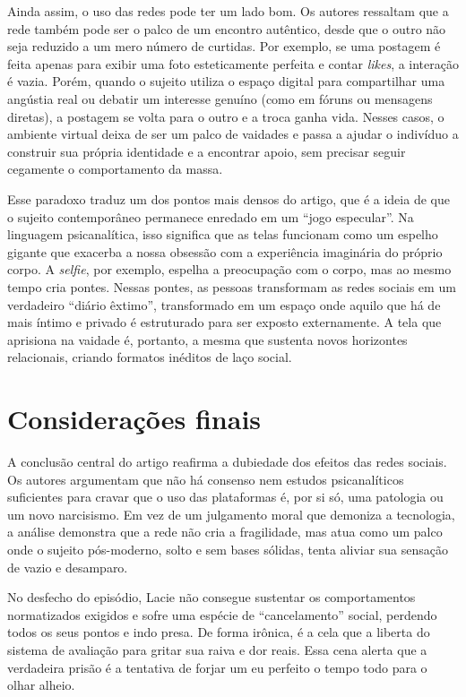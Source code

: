 \documentclass[12pt, a4paper, oneside]{abntex2}
\begin{document}
Ainda assim, o uso das redes pode ter um lado bom. Os autores ressaltam que a rede também pode ser o palco de um encontro autêntico, desde que o outro não seja reduzido a um mero número de curtidas. Por exemplo, se uma postagem é feita apenas para exibir uma foto esteticamente perfeita e contar \textit{likes}, a interação é vazia. Porém, quando o sujeito utiliza o espaço digital para compartilhar uma angústia real ou debatir um interesse genuíno (como em fóruns ou mensagens diretas), a postagem se volta para o outro e a troca ganha vida. Nesses casos, o ambiente virtual deixa de ser um palco de vaidades e passa a ajudar o indivíduo a construir sua própria identidade e a encontrar apoio, sem precisar seguir cegamente o comportamento da massa.

Esse paradoxo traduz um dos pontos mais densos do artigo, que é a ideia de que o sujeito contemporâneo permanece enredado em um ``jogo especular''. Na linguagem psicanalítica, isso significa que as telas funcionam como um espelho gigante que exacerba a nossa obsessão com a experiência imaginária do próprio corpo. A \textit{selfie}, por exemplo, espelha a preocupação com o corpo, mas ao mesmo tempo cria pontes. Nessas pontes, as pessoas transformam as redes sociais em um verdadeiro ``diário êxtimo'', transformado em um espaço onde aquilo que há de mais íntimo e privado é estruturado para ser exposto externamente. A tela que aprisiona na vaidade é, portanto, a mesma que sustenta novos horizontes relacionais, criando formatos inéditos de laço social.

\chapter{Considerações finais}
A conclusão central do artigo reafirma a dubiedade dos efeitos das redes sociais. Os autores argumentam que não há consenso nem estudos psicanalíticos suficientes para cravar que o uso das plataformas é, por si só, uma patologia ou um novo narcisismo. Em vez de um julgamento moral que demoniza a tecnologia, a análise demonstra que a rede não cria a fragilidade, mas atua como um palco onde o sujeito pós-moderno, solto e sem bases sólidas, tenta aliviar sua sensação de vazio e desamparo.

No desfecho do episódio, Lacie não consegue sustentar os comportamentos normatizados exigidos e sofre uma espécie de ``cancelamento'' social, perdendo todos os seus pontos e indo presa. De forma irônica, é a cela que a liberta do sistema de avaliação para gritar sua raiva e dor reais. Essa cena alerta que a verdadeira prisão é a tentativa de forjar um eu perfeito o tempo todo para o olhar alheio.
\end{document}
